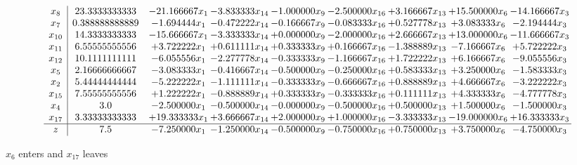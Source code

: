\documentclass[10pt]{article}
\begin{document}
 \[\begin{array}{c| c c@{\hskip 2pt} c@{\hskip 2pt} c@{\hskip 2pt} c@{\hskip 2pt} c@{\hskip 2pt} c@{\hskip 2pt} c@{\hskip 2pt} }
 x_{8}   &  23.3333333333 & -21.166667 x_{1} & -3.833333 x_{14} & -1.000000 x_{9} & -2.500000 x_{16} & + 3.166667 x_{13} & + 15.500000 x_{6} & -14.166667 x_{3}\\
 x_{7}   &  0.388888888889 & -1.694444 x_{1} & -0.472222 x_{14} & -0.166667 x_{9} & -0.083333 x_{16} & + 0.527778 x_{13} & + 3.083333 x_{6} & -2.194444 x_{3}\\
 x_{10}   &  14.3333333333 & -15.666667 x_{1} & -3.333333 x_{14} & + 0.000000 x_{9} & -2.000000 x_{16} & + 2.666667 x_{13} & + 13.000000 x_{6} & -11.666667 x_{3}\\
 x_{11}   &  6.55555555556 & + 3.722222 x_{1} & + 0.611111 x_{14} & + 0.333333 x_{9} & + 0.166667 x_{16} & -1.388889 x_{13} & -7.166667 x_{6} & + 5.722222 x_{3}\\
 x_{12}   &  10.1111111111 & -6.055556 x_{1} & -2.277778 x_{14} & -0.333333 x_{9} & -1.166667 x_{16} & + 1.722222 x_{13} & + 6.166667 x_{6} & -9.055556 x_{3}\\
 x_{5}   &  2.16666666667 & -3.083333 x_{1} & -0.416667 x_{14} & -0.500000 x_{9} & -0.250000 x_{16} & + 0.583333 x_{13} & + 3.250000 x_{6} & -1.583333 x_{3}\\
 x_{2}   &  5.44444444444 & -5.222222 x_{1} & -1.111111 x_{14} & -0.333333 x_{9} & -0.666667 x_{16} & + 0.888889 x_{13} & + 4.666667 x_{6} & -3.222222 x_{3}\\
 x_{15}   &  7.55555555556 & + 1.222222 x_{1} & -0.888889 x_{14} & + 0.333333 x_{9} & -0.333333 x_{16} & + 0.111111 x_{13} & + 4.333333 x_{6} & -4.777778 x_{3}\\
 x_{4}   &  3.0 & -2.500000 x_{1} & -0.500000 x_{14} & -0.000000 x_{9} & -0.500000 x_{16} & + 0.500000 x_{13} & + 1.500000 x_{6} & -1.500000 x_{3}\\
 x_{17}   &  3.33333333333 & + 19.333333 x_{1} & + 3.666667 x_{14} & + 2.000000 x_{9} & + 1.000000 x_{16} & -3.333333 x_{13} & -19.000000 x_{6} & + 16.333333 x_{3}\\
\hline
z    &  7.5 & -7.250000 x_{1} & -1.250000 x_{14} & -0.500000 x_{9} & -0.750000 x_{16} & + 0.750000 x_{13} & + 3.750000 x_{6} & -4.750000 x_{3}\\
\end{array}\]


 $ x_{6} $ enters and $ x_{17} $ leaves 
\end{document}

